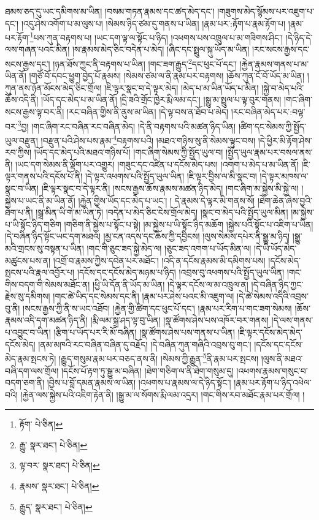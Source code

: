 ཐམས་ཅད་དུ་ཡང་དམིགས་མ་ཡིན། །བསམ་གཏན་རྣམས་དང་ཚད་མེད་དང་། །གཟུགས་མེད་སྙོམས་པར་འཇུག་པ་དང་། །འདུ་ཤེས་འགོག་པ་མ་ལུས་པ། །སེམས་ཉིད་ཙམ་དུ་གནས་པ་ཡིན། །རྣམ་པར་:རྟོག་པ་རྣམ་རྟོག་པ། །རྣམ་པར་རྟོག་\footnote{རྟོག་  པེ་ཅིན། }པས་ཀུན་བརྟགས་པ། །ཡང་དག་ལྟ་ལ་སྟོང་པ་ཉིད། །འཕགས་པས་འཁྲུལ་པ་མ་གཟིགས་ཤིང་། །དེ་ཉིད་དེ་ལས་གཞན་པའང་མིན། །ས་རྣམས་མེད་ཅིང་བདེན་པ་མེད། །ཞིང་དང་སྤྲུལ་སྐུ་ཡོད་མ་ཡིན། །རང་སངས་རྒྱས་དང་སངས་རྒྱས་དང་། །ཉན་ཐོས་ཀྱང་ནི་བརྟགས་པ་ཡིན། །གང་ཟག་རྒྱུད་\footnote{རྒྱུ་  སྣར་ཐང་།  པེ་ཅིན། }དང་ཕུང་པོ་དང་། །རྐྱེན་རྣམས་གནས་པ་མ་ཡིན་ནོ། །གཙོ་བོ་དབང་ཕྱུག་བྱེད་པོ་རྣམས། །སེམས་ཙམ་ལ་ནི་རྣམ་པར་བརྟགས། །ཆོས་ཀུན་ངོ་བོ་ཡོད་མ་ཡིན། །ཀུན་ནས་ཉོན་མོངས་མེད་ཅིང་གྲོལ། །ཇི་ལྟར་སྣང་བ་དེ་ལྟར་མེད། །མེད་པ་མ་ཡིན་ཡོད་པ་མིན། །སྐྱེ་བ་མེད་པའི་ཆོས་འདི་ནི། །ཡོད་དང་མེད་པ་མ་ཡིན་ནོ། །དྲི་ཟའི་གྲོང་ཁྱེར་རྨི་ལམ་དང་། །སྒྱུ་མ་སྤྲུལ་པ་ལྟ་བུར་གནས། །གང་ཞིག་སངས་རྒྱས་ལྟ་བར་ནི། །རང་བཞིན་གྱིས་ནི་ནུས་མ་ཡིན། །དེ་ལྟ་བས་ན་ཐོབ་པ་མེད། །རང་བཞིན་མེད་པར་:བལྟ་བར་\footnote{ལྟ་བར་  སྣར་ཐང་།  པེ་ཅིན། }བྱ། །གང་ཞིག་རང་བཞིན་རང་བཞིན་མེད། །དེ་ནི་བརྟགས་པའི་མཚན་ཉིད་ཡིན། །ཚིག་དང་སེམས་ཀྱི་སྤྱོད་ཡུལ་བརྫུན། །བརྫུན་པའི་ཤེས་པས་རྣམ་\footnote{རྣམས་  སྣར་ཐང་།  པེ་ཅིན། }བརྟགས་པའི། །མཐའ་གཉིས་སུ་ནི་སེམས་ལྟུང་བས། །དེ་ཕྱིར་མི་རྟོག་ཤེས་རབ་ཀྱིས། །ཡོད་དང་མེད་པའི་མཐའ་གཉིས་པོ། །གང་ཞིག་སེམས་ཀྱི་སྤྱོད་ཡུལ་བ། །སྤྱོད་ཡུལ་རྣམ་པར་བསལ་ནས་ནི། །ཡང་དག་སེམས་ནི་ལྡོག་པར་འགྱུར། །གཟུང་དང་འཛིན་པ་དངོས་མེད་པས། །འགག་པ་མེད་པ་མ་ཡིན་ནོ། །ཇི་ལྟར་གནས་པའི་དངོས་པོ་ནི། །དེ་ལྟར་འཕགས་པའི་སྤྱོད་ཡུལ་ཡིན། །ཇི་ལྟར་བྱིས་ལ་མི་སྣང་བ། །དེ་ལྟར་མཁས་ལ་སྣང་བ་ཡིན། །ཇི་ལྟར་སྣང་བ་དེ་ལྟར་ནི། །སངས་རྒྱས་ཆོས་རྣམས་མཚན་ཉིད་མེད། །གང་ཞིག་མ་སྐྱེས་མི་སྐྱེ་ལ། །སྐྱེས་པ་ཡང་ནི་མ་ཡིན་ནོ། །རྐྱེན་གྱིས་ཡོད་དང་མེད་པ་ཡང་། །
དེ་རྣམས་དེ་ལྟར་མི་གནས་སོ། །ཐེག་ཆེན་ཞེས་བྱའི་ཐེག་པ་ནི། །སྒྲ་མིན་ཡི་གེ་མ་ཡིན་ཏེ། །བདེན་པ་མེད་ཅིང་ངེས་གྲོལ་མེད། །སྣང་བ་མེད་པའི་སྤྱོད་ཡུལ་མིན། །མ་སྐྱེས་པ་ཡི་སྟོང་ཉིད་གཅིག །གཅིག་ནི་སྐྱེས་པ་སྟོང་པ་སྟེ། །མ་སྐྱེས་པ་ཡི་སྟོང་ཉིད་མཆོག །སྐྱེས་པའི་སྟོང་པ་འཇིག་པ་ཡིན། །དེ་བཞིན་ཉིད་སྟོང་ཡང་དག་མཐའ། །མྱ་ངན་འདས་དང་ཆོས་ཀྱི་དབྱིངས། །ལུས་སེམས་དཔེར་ནི་སྒྱུ་མ་ཉིད། །སྒྱུ་མའི་གྲངས་སུ་བསྟན་པ་ཡིན། །གང་གི་ཅུང་ཟད་སྐྱེ་མེད་ལ། །ཅུང་ཟད་འགག་པ་ཡོད་མིན་ལ། །དེ་ཡི་ཡོད་མེད་མཚུངས་པས་ན། །འགྲོ་བ་རྣམས་ཀྱིས་དབེན་པར་མཐོང་། །འདི་ན་དངོས་རྣམས་མི་དམིགས་པས། །དངོས་མེད་སྤངས་པའི་རྣལ་འབྱོར་པ། །དངོས་དང་དངོས་མེད་མཉམ་པ་ཉིད། །འབྲས་བུ་འཕགས་པའི་སྤྱོད་ཡུལ་ཡིན། །གང་གིས་བདག་གི་སེམས་མཐོང་ན། །ཕྱི་ཡི་དོན་ནི་ཡོད་མ་ཡིན། །དེ་ལྟར་དངོས་ལ་མ་འཁྲུལ་ན། །དེ་བཞིན་ཉིད་ཀྱང་རྗེས་སུ་དམིགས། །གང་ཚེ་ཡིད་དང་སེམས་དང་ནི། །རྣམ་པར་ཤེས་པའང་མི་འཇུག་ལ། །དེ་ཚེ་སེམས་འདིའི་འབྲས་བུ་ནི། །སངས་རྒྱས་ཀྱི་ནི་ས་ཡང་འཐོབ། །རྐྱེན་གྱི་ཚིག་དང་ཕུང་པོ་དང་། །རྣམ་པར་རིག་པ་གང་ཟག་སེམས། །ཆོས་རྣམས་འདི་དག་མཚན་ཉིད་ནི། །རྨི་ལམ་སྐྲ་ཤད་ལྟ་བུ་ཡིན། །སྣ་ཚོགས་ཤེས་པས་འཁོར་བར་གནས། །དེ་ལས་གནས་པ་འབྱུང་བ་ཡིན། །རྩིག་པ་ཡོད་པར་རི་མོ་བཞིན། །སྣ་ཚོགས་ཤེས་པས་གནས་པ་ཡིན། །ཇི་ལྟར་དངོས་མེད་མེད་དངོས་མེད། །ནམ་མཁའི་རང་བཞིན་བཞིན་དུ་བརྗོད། །དེ་བཞིན་ཀུན་གཞིའི་འབྲས་བུ་གང་། །དངོས་དང་དངོས་མེད་རྣམ་སྤངས་ཏེ། །རྒྱུད་གསུམ་རྣམ་པར་བཅད་ནས་ནི། །སེམས་ཀྱི་རྒྱུན་\footnote{རྒྱུད་  སྣར་ཐང་།  པེ་ཅིན། }ནི་རྣམ་པར་སྤངས། །ལུས་ནི་མཐའ་བཞི་དག་ལས་གྲོལ། །དངོས་པོ་རྟག་ཏུ་སྒྱུ་མ་བཞིན། །ཐེག་གཅིག་ལ་ནི་ཐེག་གསུམ་དུ། །འཕགས་རྣམས་གསུང་བ་བདག་ཅག་ནི། །བྱིས་པ་བློ་དམན་རྣམས་ལ་ཡིན། །འཕགས་པ་རྣམས་ལ་དེ་ཉིད་སྟོང་། །རྣམ་པར་རྟོག་པ་ཉིད་འཕེལ་བའི། །རྐྱེན་ལས་སྐྱེས་པའི་འཇིག་རྟེན་ནི། །སྒྱུ་མ་ལ་སོགས་རྨི་ལམ་འདྲར། །གང་གིས་རབ་མཐོང་རྣམ་པར་གྲོལ། །
